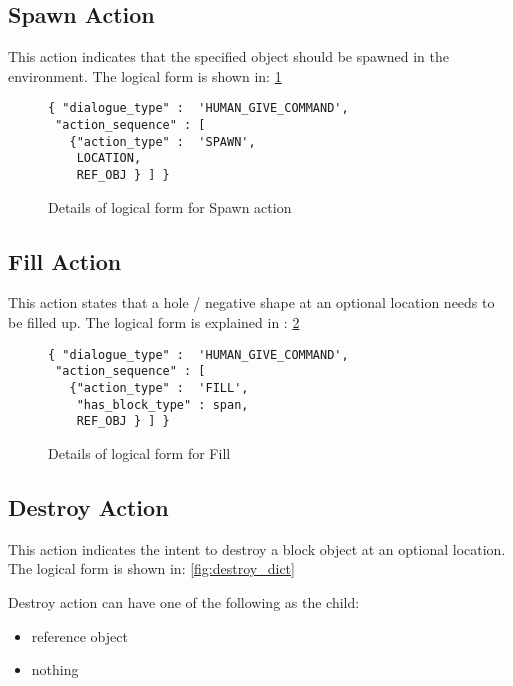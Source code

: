 \subsection{ Spawn Action}
This action indicates that the specified object should be spawned in the environment. The logical form is shown in: \ref{fig:spawn_dict}

\begin{figure}[ht]
    \centering
    \fontsize{8pt}{8pt}\selectfont
    \begin{verbatim}
{ "dialogue_type" :  'HUMAN_GIVE_COMMAND',
 "action_sequence" : [
   {"action_type" :  'SPAWN',
    LOCATION,
    REF_OBJ } ] }
    \end{verbatim}
    \vspace{-20pt}
    \caption{Details of logical form for Spawn action}
    \vspace{-8pt}
    \label{fig:spawn_dict}
\end{figure}



\subsection{ Fill Action}
This action states that a hole / negative shape at an optional location needs to be filled up. The logical form  is explained in : \ref{fig:fill_dict}

\begin{figure}[ht]
    \centering
    \fontsize{8pt}{8pt}\selectfont
    \begin{verbatim}
{ "dialogue_type" :  'HUMAN_GIVE_COMMAND',
 "action_sequence" : [
   {"action_type" :  'FILL',
    "has_block_type" : span,
    REF_OBJ } ] }
    \end{verbatim}
    \vspace{-20pt}
    \caption{Details of logical form  for Fill}
    \vspace{-8pt}
    \label{fig:fill_dict}
\end{figure}



\subsection{ Destroy Action}
This action indicates the intent to destroy a block object at an optional location. The logical form  is shown in: \ref{fig:destroy_dict}

Destroy action can have one of the following as the child:
\begin{itemize}
	\setlength\itemsep{0.0em}
	\item reference object
	\item nothing
\end{itemize}

